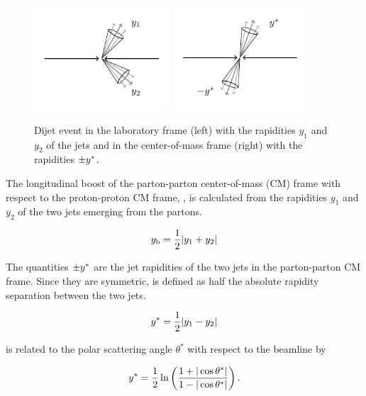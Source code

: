 \begin{figure}[htbp]
    \centering
    \includegraphics[width=0.45\textwidth]{figures/drawings/dijet_lab.pdf}
    \includegraphics[width=0.45\textwidth]{figures/drawings/dijet_cm.pdf}
    \caption[Dijet event in laboratory and center-of-mass frame.]
        {Dijet event in the laboratory frame (left) with the rapidities $y_1$
        and $y_2$ of the jets and in the center-of-mass frame (right) with the
    rapidities $\pm y^*$.}
    \label{fig:dijet_cm_lab_frame}
\end{figure}

The longitudinal boost of the parton-parton center-of-mass (CM) frame with
respect to the proton-proton CM frame, \yboost, is calculated from the
rapidities $y_1$ and $y_2$ of the two jets emerging from the partons. 

\begin{equation*}
    y_{\mathrm{b}} = \frac{1}{2} |y_1 + y_2|
\end{equation*}

The quantities $\pm y^*$ are the jet rapidities of the two jets in the
parton-parton CM frame. Since they are symmetric, \ystar is defined as half the
absolute rapidity separation between the two jets.

\begin{equation*}
    y^* = \frac{1}{2} |y_1 - y_2|
\end{equation*}

\ystar is related to the polar scattering angle $\theta^*$ with respect to the
beamline by 

\begin{equation*}
    y^* = \frac{1}{2} \ln \left( \frac{1 + |\cos \theta^*|}{1- | \cos \theta^*|} \right).
\end{equation*}
